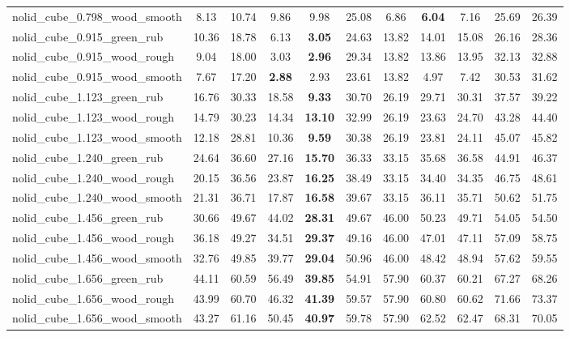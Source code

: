 \begin{table}[H]
{\begin{tabular}{l cccccccccc}
        nolid\_cube\_0.798\_wood\_smooth & 8.13 & 10.74 & 9.86 & 9.98 & 25.08 & 6.86 & \textbf{6.04} & 7.16 & 25.69 & 26.39 \\
        nolid\_cube\_0.915\_green\_rub & 10.36 & 18.78 & 6.13 & \textbf{3.05} & 24.63 & 13.82 & 14.01 & 15.08 & 26.16 & 28.36 \\
        nolid\_cube\_0.915\_wood\_rough & 9.04 & 18.00 & 3.03 & \textbf{2.96} & 29.34 & 13.82 & 13.86 & 13.95 & 32.13 & 32.88 \\
        nolid\_cube\_0.915\_wood\_smooth & 7.67 & 17.20 & \textbf{2.88} & 2.93 & 23.61 & 13.82 & 4.97 & 7.42 & 30.53 & 31.62 \\
        nolid\_cube\_1.123\_green\_rub & 16.76 & 30.33 & 18.58 & \textbf{9.33} & 30.70 & 26.19 & 29.71 & 30.31 & 37.57 & 39.22 \\
        nolid\_cube\_1.123\_wood\_rough & 14.79 & 30.23 & 14.34 & \textbf{13.10} & 32.99 & 26.19 & 23.63 & 24.70 & 43.28 & 44.40 \\
        nolid\_cube\_1.123\_wood\_smooth & 12.18 & 28.81 & 10.36 & \textbf{9.59} & 30.38 & 26.19 & 23.81 & 24.11 & 45.07 & 45.82 \\
        nolid\_cube\_1.240\_green\_rub & 24.64 & 36.60 & 27.16 & \textbf{15.70} & 36.33 & 33.15 & 35.68 & 36.58 & 44.91 & 46.37 \\
        nolid\_cube\_1.240\_wood\_rough & 20.15 & 36.56 & 23.87 & \textbf{16.25} & 38.49 & 33.15 & 34.40 & 34.35 & 46.75 & 48.61 \\
        nolid\_cube\_1.240\_wood\_smooth & 21.31 & 36.71 & 17.87 & \textbf{16.58} & 39.67 & 33.15 & 36.11 & 35.71 & 50.62 & 51.75 \\
        nolid\_cube\_1.456\_green\_rub & 30.66 & 49.67 & 44.02 & \textbf{28.31} & 49.67 & 46.00 & 50.23 & 49.71 & 54.05 & 54.50 \\
        nolid\_cube\_1.456\_wood\_rough & 36.18 & 49.27 & 34.51 & \textbf{29.37} & 49.16 & 46.00 & 47.01 & 47.11 & 57.09 & 58.75 \\
        nolid\_cube\_1.456\_wood\_smooth & 32.76 & 49.85 & 39.77 & \textbf{29.04} & 50.96 & 46.00 & 48.42 & 48.94 & 57.62 & 59.55 \\
        nolid\_cube\_1.656\_green\_rub & 44.11 & 60.59 & 56.49 & \textbf{39.85} & 54.91 & 57.90 & 60.37 & 60.21 & 67.27 & 68.26 \\
        nolid\_cube\_1.656\_wood\_rough & 43.99 & 60.70 & 46.32 & \textbf{41.39} & 59.57 & 57.90 & 60.80 & 60.62 & 71.66 & 73.37 \\
        nolid\_cube\_1.656\_wood\_smooth & 43.27 & 61.16 & 50.45 & \textbf{40.97} & 59.78 & 57.90 & 62.52 & 62.47 & 68.31 & 70.05 \\

\end{tabular}}
\end{table}
